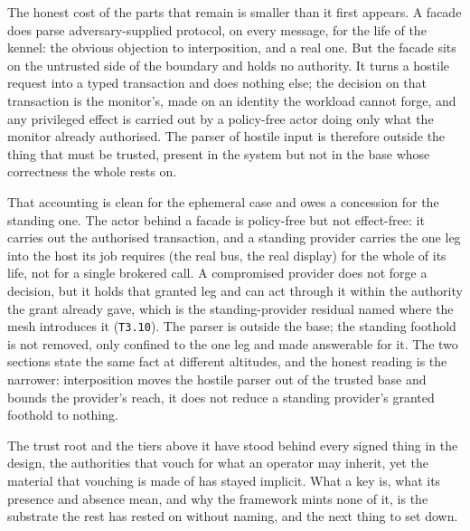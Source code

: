 The honest cost of the parts that remain is smaller than it first
appears. A facade does parse adversary-supplied protocol, on every
message, for the life of the kennel: the obvious objection to
interposition, and a real one. But the facade sits on the untrusted side
of the boundary and holds no authority. It turns a hostile request into
a typed transaction and does nothing else; the decision on that
transaction is the monitor's, made on an identity the workload cannot
forge, and any privileged effect is carried out by a policy-free actor
doing only what the monitor already authorised. The parser of hostile
input is therefore outside the thing that must be trusted, present in
the system but not in the base whose correctness the whole rests on.

That accounting is clean for the ephemeral case and owes a concession
for the standing one. The actor behind a facade is policy-free but not
effect-free: it carries out the authorised transaction, and a standing
provider carries the one leg into the host its job requires (the real
bus, the real display) for the whole of its life, not for a single
brokered call. A compromised provider does not forge a decision, but it
holds that granted leg and can act through it within the authority the
grant already gave, which is the standing-provider residual named where
the mesh introduces it (\texttt{T3.10}). The parser is outside the base;
the standing foothold is not removed, only confined to the one leg and
made answerable for it. The two sections state the same fact at
different altitudes, and the honest reading is the narrower:
interposition moves the hostile parser out of the trusted base and
bounds the provider's reach, it does not reduce a standing provider's
granted foothold to nothing.

The trust root and the tiers above it have stood behind every signed
thing in the design, the authorities that vouch for what an operator may
inherit, yet the material that vouching is made of has stayed implicit.
What a key is, what its presence and absence mean, and why the framework
mints none of it, is the substrate the rest has rested on without
naming, and the next thing to set down.
